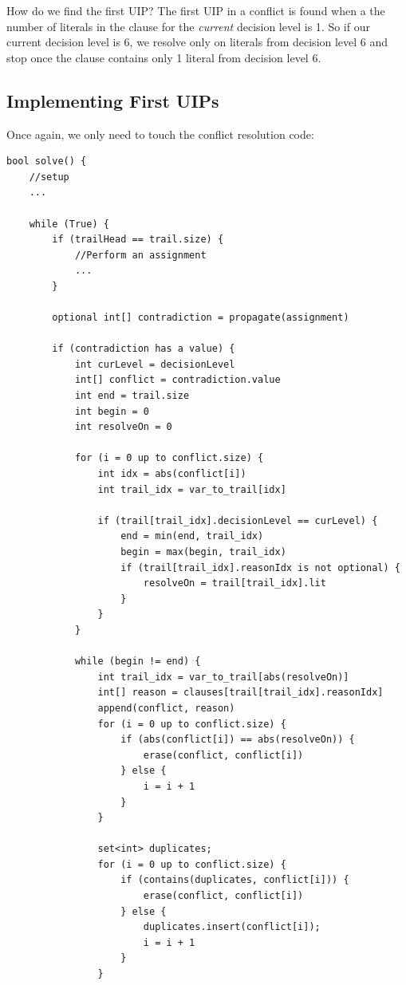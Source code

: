 \documentclass[oneside]{book}
\begin{document}
How do we find the first UIP? The first UIP in a conflict is found when a the number 
of literals in the clause for the \textit{current} decision level is 1. So if our current 
decision level is 6, we resolve only on literals from decision level 6 and stop once the 
clause contains only 1 literal from decision level 6.

\subsection{Implementing First UIPs}

Once again, we only need to touch the conflict resolution code:

\begin{lstlisting}
bool solve() {
    //setup
    ...

    while (True) {
        if (trailHead == trail.size) {
            //Perform an assignment
            ...
        }

        optional int[] contradiction = propagate(assignment)

        if (contradiction has a value) {
            int curLevel = decisionLevel
            int[] conflict = contradiction.value
            int end = trail.size
            int begin = 0
            int resolveOn = 0

            for (i = 0 up to conflict.size) {
                int idx = abs(conflict[i])
                int trail_idx = var_to_trail[idx]

                if (trail[trail_idx].decisionLevel == curLevel) {
                    end = min(end, trail_idx)
                    begin = max(begin, trail_idx)
                    if (trail[trail_idx].reasonIdx is not optional) {
                        resolveOn = trail[trail_idx].lit
                    }
                }
            }

            while (begin != end) {
                int trail_idx = var_to_trail[abs(resolveOn)]
                int[] reason = clauses[trail[trail_idx].reasonIdx]
                append(conflict, reason)
                for (i = 0 up to conflict.size) {
                    if (abs(conflict[i]) == abs(resolveOn)) {
                        erase(conflict, conflict[i])
                    } else {
                        i = i + 1
                    }
                }

                set<int> duplicates;
                for (i = 0 up to conflict.size) {
                    if (contains(duplicates, conflict[i])) {
                        erase(conflict, conflict[i])
                    } else {
                        duplicates.insert(conflict[i]);
                        i = i + 1
                    }
                }


\end{lstlisting}
\end{document}
